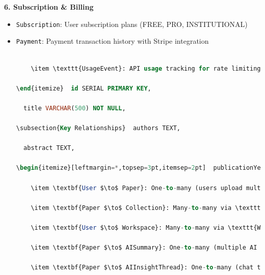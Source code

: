 \textbf{6. Subscription \& Billing}

\begin{itemize}[leftmargin=*,topsep=3pt,itemsep=2pt]\subsection{Paper Table}

    \item \texttt{Subscription}: User subscription plans (FREE, PRO, INSTITUTIONAL)

    \item \texttt{Payment}: Payment transaction history with Stripe integration\begin{lstlisting}[language=SQL, caption={Paper Table Schema}]

    \item \texttt{UsageEvent}: API usage tracking for rate limiting and billingCREATE TABLE "Paper" (

\end{itemize}  id SERIAL PRIMARY KEY,

  title VARCHAR(500) NOT NULL,

\subsection{Key Relationships}  authors TEXT,

  abstract TEXT,

\begin{itemize}[leftmargin=*,topsep=3pt,itemsep=2pt]  publicationYear INTEGER,

    \item \textbf{User $\to$ Paper}: One-to-many (users upload multiple papers)  journal VARCHAR(255),

    \item \textbf{Paper $\to$ Collection}: Many-to-many via \texttt{CollectionPaper}  doi VARCHAR(255),

    \item \textbf{User $\to$ Workspace}: Many-to-many via \texttt{WorkspaceMember}  fileUrl TEXT NOT NULL,

    \item \textbf{Paper $\to$ AISummary}: One-to-many (multiple AI summaries per paper)  fileName VARCHAR(500) NOT NULL,

    \item \textbf{Paper $\to$ AIInsightThread}: One-to-many (chat threads per paper)  fileSize BIGINT NOT NULL,


\end{lstlisting}
\end{itemize}
